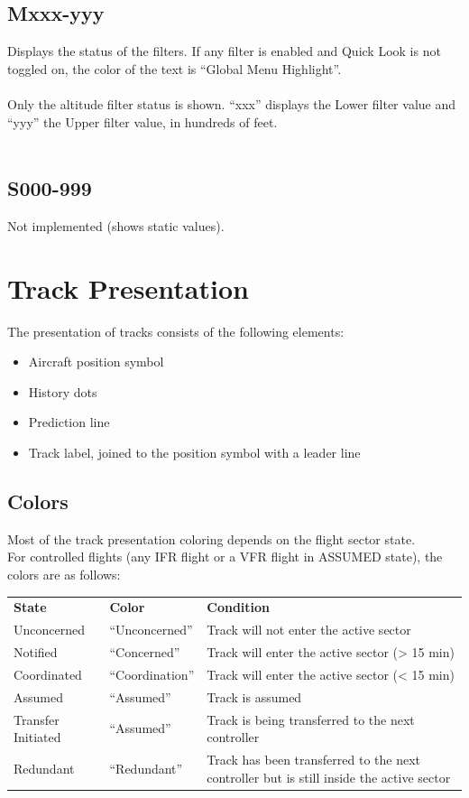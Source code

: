 \documentclass[11pt,a4paper,oldfontcommands]{memoir}
\begin{document}
\subsection{Mxxx-yyy}
Displays the status of the filters. If any filter is enabled and Quick Look is not toggled on, the color of the
text is “Global Menu Highlight”.\\\\
Only the altitude filter status is shown. “xxx” displays the Lower filter value and “yyy” the Upper filter
value, in hundreds of feet.\\\\

\subsection{S000-999}
Not implemented (shows static values).\\

\section{Track Presentation}
The presentation of tracks consists of the following elements:
\begin{itemize}
\item{Aircraft position symbol}
\item{History dots}
\item{Prediction line}
\item{Track label, joined to the position symbol with a leader line}
\end{itemize}

\subsection{Colors}
Most of the track presentation coloring depends on the flight sector state.
\\For controlled flights (any IFR flight or a VFR flight in ASSUMED state), the colors are as follows:\\
\begin{tabular}{p{5cm}p{5cm}p{5cm}}
\textbf{State}          & \textbf{Color}    & \textbf{Condition}
\\Unconcerned           & “Unconcerned”     & Track will not enter the active sector
\\Notified              & “Concerned”       & Track will enter the active sector (> 15 min)
\\Coordinated           & “Coordination”    & Track will enter the active sector (< 15 min)
\\Assumed               & “Assumed”         & Track is assumed
\\Transfer Initiated    & “Assumed”         & Track is being transferred to the next controller
\\Redundant             & “Redundant”       & Track has been transferred to the next controller but is still inside the active sector
\end{tabular}\\
\end{document}
